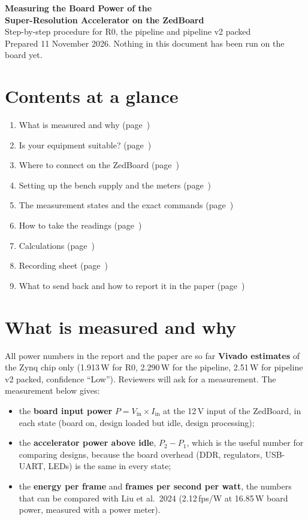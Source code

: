 \documentclass[11pt,a4paper]{article}
\begin{document}
\begin{center}
{\LARGE\bfseries Measuring the Board Power of the\\[2pt] Super-Resolution Accelerator on the ZedBoard}\\[6pt]
{\large Step-by-step procedure for R0, the pipeline and pipeline v2 packed}\\[4pt]
{\small Prepared 11 November 2026. Nothing in this document has been run on the board yet.}
\end{center}

\section*{Contents at a glance}
\begin{enumerate}[label=\arabic*.]
  \item What is measured and why (page~\pageref{sec:what})
  \item Is your equipment suitable? (page~\pageref{sec:equip})
  \item Where to connect on the ZedBoard (page~\pageref{sec:where})
  \item Setting up the bench supply and the meters (page~\pageref{sec:setup})
  \item The measurement states and the exact commands (page~\pageref{sec:states})
  \item How to take the readings (page~\pageref{sec:read})
  \item Calculations (page~\pageref{sec:calc})
  \item Recording sheet (page~\pageref{sec:sheet})
  \item What to send back and how to report it in the paper (page~\pageref{sec:report})
\end{enumerate}

\section{What is measured and why}\label{sec:what}

All power numbers in the report and the paper are so far \textbf{Vivado estimates} of the Zynq chip only (1.913\,W for R0, 2.290\,W for the pipeline, 2.51\,W for pipeline v2 packed, confidence ``Low''). Reviewers will ask for a measurement. The measurement below gives:

\begin{itemize}
  \item the \textbf{board input power} $P = V_\mathrm{in}\times I_\mathrm{in}$ at the 12\,V input of the ZedBoard, in each state (board on, design loaded but idle, design processing);
  \item the \textbf{accelerator power above idle}, $P_2 - P_1$, which is the useful number for comparing designs, because the board overhead (DDR, regulators, USB-UART, LEDs) is the same in every state;
  \item the \textbf{energy per frame} and \textbf{frames per second per watt}, the numbers that can be compared with Liu et al.\ 2024 (2.12\,fps/W at 16.85\,W board power, measured with a power meter).
\end{itemize}
\end{document}
